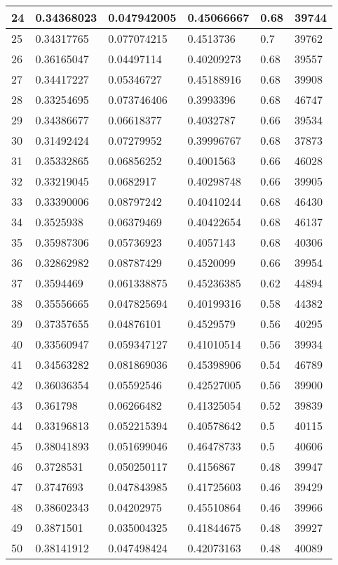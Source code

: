 \begin{longtable}{|l|l|l|l|l|l|}
24 & 0.34368023 & 0.047942005 & 0.45066667 & 0.68 & 39744 \\ \hline 
25 & 0.34317765 & 0.077074215 & 0.4513736 & 0.7 & 39762 \\ \hline 
26 & 0.36165047 & 0.04497114 & 0.40209273 & 0.68 & 39557 \\ \hline 
27 & 0.34417227 & 0.05346727 & 0.45188916 & 0.68 & 39908 \\ \hline 
28 & 0.33254695 & 0.073746406 & 0.3993396 & 0.68 & 46747 \\ \hline 
29 & 0.34386677 & 0.06618377 & 0.4032787 & 0.66 & 39534 \\ \hline 
30 & 0.31492424 & 0.07279952 & 0.39996767 & 0.68 & 37873 \\ \hline 
31 & 0.35332865 & 0.06856252 & 0.4001563 & 0.66 & 46028 \\ \hline 
32 & 0.33219045 & 0.0682917 & 0.40298748 & 0.66 & 39905 \\ \hline 
33 & 0.33390006 & 0.08797242 & 0.40410244 & 0.68 & 46430 \\ \hline 
34 & 0.3525938 & 0.06379469 & 0.40422654 & 0.68 & 46137 \\ \hline 
35 & 0.35987306 & 0.05736923 & 0.4057143 & 0.68 & 40306 \\ \hline 
36 & 0.32862982 & 0.08787429 & 0.4520099 & 0.66 & 39954 \\ \hline 
37 & 0.3594469 & 0.061338875 & 0.45236385 & 0.62 & 44894 \\ \hline 
38 & 0.35556665 & 0.047825694 & 0.40199316 & 0.58 & 44382 \\ \hline 
39 & 0.37357655 & 0.04876101 & 0.4529579 & 0.56 & 40295 \\ \hline 
40 & 0.33560947 & 0.059347127 & 0.41010514 & 0.56 & 39934 \\ \hline 
41 & 0.34563282 & 0.081869036 & 0.45398906 & 0.54 & 46789 \\ \hline 
42 & 0.36036354 & 0.05592546 & 0.42527005 & 0.56 & 39900 \\ \hline 
43 & 0.361798 & 0.06266482 & 0.41325054 & 0.52 & 39839 \\ \hline 
44 & 0.33196813 & 0.052215394 & 0.40578642 & 0.5 & 40115 \\ \hline 
45 & 0.38041893 & 0.051699046 & 0.46478733 & 0.5 & 40606 \\ \hline 
46 & 0.3728531 & 0.050250117 & 0.4156867 & 0.48 & 39947 \\ \hline 
47 & 0.3747693 & 0.047843985 & 0.41725603 & 0.46 & 39429 \\ \hline 
48 & 0.38602343 & 0.04202975 & 0.45510864 & 0.46 & 39966 \\ \hline 
49 & 0.3871501 & 0.035004325 & 0.41844675 & 0.48 & 39927 \\ \hline 
50 & 0.38141912 & 0.047498424 & 0.42073163 & 0.48 & 40089 \\ \hline 
\end{longtable}